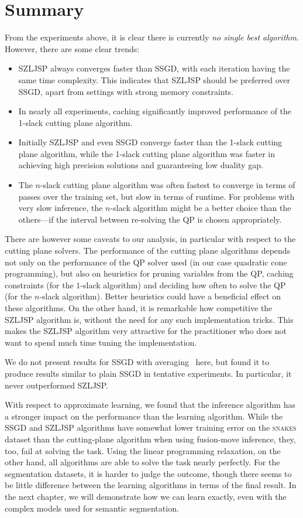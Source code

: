 \section{Summary}
From the experiments above, it is clear there is currently \emph{no single best algorithm}.
However, there are some clear trends:
\begin{itemize}
    \item SZLJSP always converges faster than SSGD, with each iteration having
        the same time complexity.  This indicates that SZLJSP should be
        preferred over SSGD, apart from settings with strong memory
        constraints.
    \item In nearly all experiments, caching significantly improved performance
        of the 1-slack cutting plane algorithm.
    \item Initially SZLJSP and even SSGD converge faster than the 1-slack
        cutting plane algorithm, while the 1-slack cutting plane algorithm was
        faster in achieving high precision solutions and guaranteeing low
        duality gap.
    \item The $n$-slack cutting plane algorithm was often fastest to converge in
        terms of passes over the training set, but slow in terms of
        runtime. For problems with very slow inference, the $n$-slack algorithm
        might be a better choice than the others---if the interval between re-solving
        the QP is chosen appropriately.
\end{itemize}
There are however some caveats to our analysis, in particular with respect to
the cutting plane solvers. The performance of the cutting plane algorithms
depends not only on the performance of the QP solver used (in our case
quadratic cone programming), but also on heuristics for pruning variables from
the QP, caching constraints (for the $1$-slack algorithm) and deciding how
often to solve the QP (for the $n$-slack algorithm). Better heuristics could
have a beneficial effect on these algorithms. On the other hand, it is
remarkable how competitive the SZLJSP algorithm is, without the need for any
such implementation tricks. This makes the SZLJSP algorithm very attractive for
the practitioner who does not want to spend much time tuning the
implementation.

We do not present results for SSGD with averaging~\citep{lacoste2012simpler} here, but
found it to produce results similar to plain SSGD in tentative experiments. In
particular, it never outperformed SZLJSP.

With respect to approximate learning, we found that the inference algorithm has
a stronger impact on the performance than the learning algorithm.
While the SSGD and SZLJSP algorithms have somewhat lower training error on the \textsc{snakes} dataset than
the cutting-plane algorithm when using fusion-move inference, they, too, fail at solving the task.
Using the linear programming relaxation, on the other hand, all algorithms are able to solve the
task nearly perfectly.
For the segmentation datasets, it is harder to judge the outcome, though there
seems to be little difference between the learning algorithms in terms of the
final result.  In the next chapter, we will demonstrate how we can learn
exactly, even with the complex models used for semantic segmentation.
